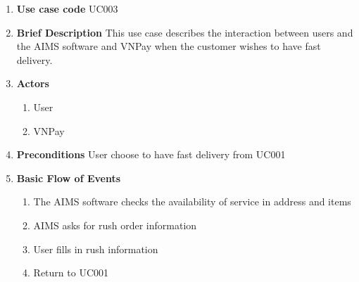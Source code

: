 \documentclass[../UseCaseSpecification.tex]{subfiles}
\begin{document}
\begin{enumerate}
    \item \textbf{Use case code}
    \newline
    UC003

    \item \textbf{Brief Description}
    \newline
    This use case describes the interaction between users and the AIMS software and VNPay when the customer wishes to have fast delivery.

    \item \textbf{Actors}
    \begin{enumerate}
        \item User
        \item VNPay
    \end{enumerate}

    \item \textbf{Preconditions}
    \newline
    User choose to have fast delivery from UC001

    \item \textbf{Basic Flow of Events}
    \begin{enumerate}
        \item The AIMS software checks the availability of service in address and items
        \item AIMS asks for rush order information
        \item User fills in rush information
        \item Return to UC001
    \end{enumerate}


\end{enumerate}
\end{document}
